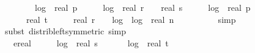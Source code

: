 \begin{isabellebody}
\ \ \ \ \ \ {}\ {\isacharasterisk}{\kern0pt}\ log\ {}\ {\isacharparenleft}{\kern0pt}real\ p\ {\isacharplus}{\kern0pt}\ {}{\isacharparenright}{\kern0pt}\ {\isacharplus}{\kern0pt}\ {}\ {\isacharasterisk}{\kern0pt}\ log\ {}\ {\isacharparenleft}{\kern0pt}real\ r\ {\isacharplus}{\kern0pt}\ {}{\isacharparenright}{\kern0pt}\ {\isacharplus}{\kern0pt}\ real\ s\ {\isacharasterisk}{\kern0pt}\ {\isacharparenleft}{\kern0pt}{}\ {\isacharplus}{\kern0pt}\ {}\ {\isacharasterisk}{\kern0pt}\ log\ {}\ {\isacharparenleft}{\kern0pt}real\ p{\isacharparenright}{\kern0pt}\ {\isacharplus}{\kern0pt}\ \isanewline
\ \ \ \ \ \ real\ t\ {\isacharasterisk}{\kern0pt}\ {\isacharparenleft}{\kern0pt}{}{}\ {\isacharplus}{\kern0pt}\ {\isacharparenleft}{\kern0pt}{}\ {\isacharasterisk}{\kern0pt}\ real\ r\ {\isacharplus}{\kern0pt}\ {}\ {\isacharasterisk}{\kern0pt}\ log\ {}\ {\isacharparenleft}{\kern0pt}log\ {}\ {\isacharparenleft}{\kern0pt}real\ n\ {\isacharplus}{\kern0pt}\ {}{\isacharparenright}{\kern0pt}{\isacharparenright}{\kern0pt}{\isacharparenright}{\kern0pt}{\isacharparenright}{\kern0pt}{\isacharparenright}{\kern0pt}{\isacharparenright}{\kern0pt}{\isachardoublequoteclose}\isanewline
\ \ \ \ \ \ \isamarkupfalse%
\ {\isacharparenleft}{\kern0pt}simp{\isacharparenright}{\kern0pt}\isanewline
\ \ \ \ \ \ \isamarkupfalse%
\ {\isacharparenleft}{\kern0pt}subst\ distrib{\isacharunderscore}{\kern0pt}left{\isacharbrackleft}{\kern0pt}symmetric{\isacharbrackright}{\kern0pt}{\isacharcomma}{\kern0pt}\ simp{\isacharparenright}{\kern0pt}\ \isanewline
\ \ \ \ \isamarkupfalse%
\ \isamarkupfalse%
\ {\isachardoublequoteopen}{\isachardot}{\kern0pt}{\isachardot}{\kern0pt}{\isachardot}{\kern0pt}\ {\isasymle}\ ereal\ {\isacharparenleft}{\kern0pt}\ {}\ {\isacharplus}{\kern0pt}\ {}\ {\isacharasterisk}{\kern0pt}\ log\ {}\ {\isacharparenleft}{\kern0pt}real\ s\ {\isacharplus}{\kern0pt}\ {}{\isacharparenright}{\kern0pt}\ \ {\isacharplus}{\kern0pt}\ {}\ {\isacharasterisk}{\kern0pt}\ log\ {}\ {\isacharparenleft}{\kern0pt}real\ t\ {\isacharplus}{\kern0pt}\ {}{\isacharparenright}{\kern0pt}\ {\isacharplus}{\kern0pt}\ \isanewline

\end{isabellebody}
